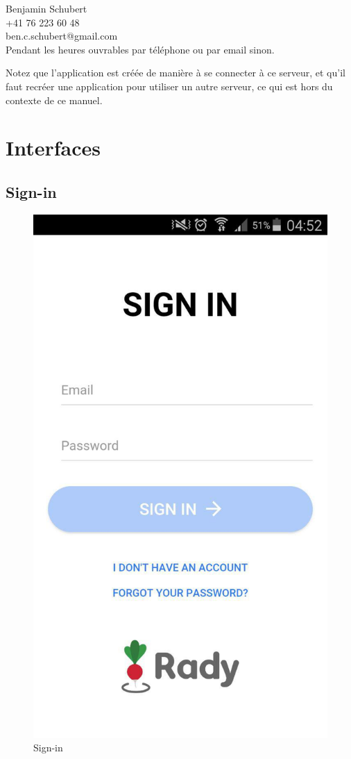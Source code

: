 \documentclass[french]{article}
\begin{document}
		Benjamin Schubert \\
		+41 76 223 60 48 \\
		ben.c.schubert@gmail.com \\
	
	Pendant les heures ouvrables par téléphone ou par email sinon.
	
	Notez que l'application est créée de manière à se connecter à ce serveur, et qu'il faut recréer une application pour utiliser un autre serveur, ce qui est hors du contexte de ce manuel.
	
	
	\section{Interfaces}
	\subsection{Sign-in}
	\begin{figure}[H]
		\centering
		\includegraphics[scale=0.4]{../screenshot/screenshot-sign-in}
		\caption{Sign-in}
		\label{Sign-in}
	\end{figure} 
	
\end{document}
